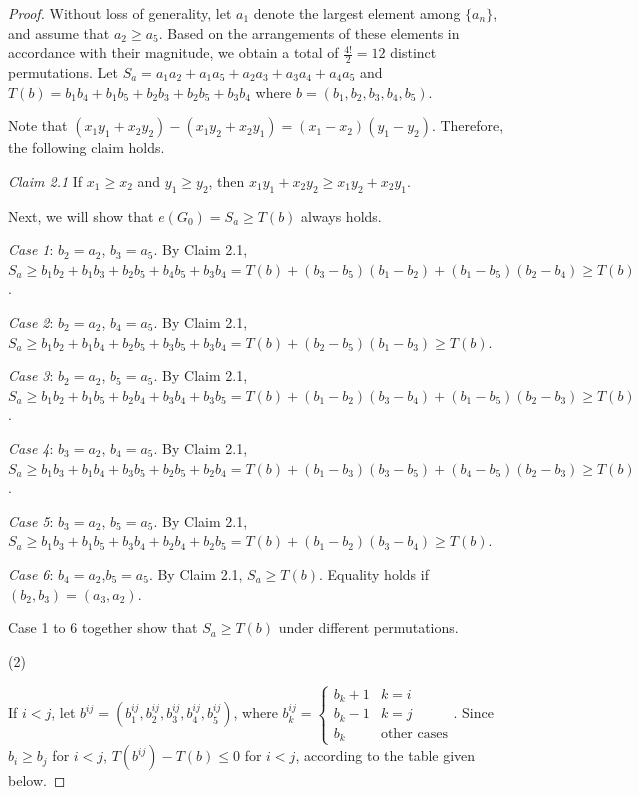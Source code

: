 \documentclass[11pt, oneside]{article}   	%
\begin{document}
\begin{proof}
Without loss of generality, let $ a_1 $ denote the largest element among $\{a_n\}$, and assume that $ a_2 \geq a_5 $. Based on the arrangements of these elements in accordance with their magnitude, we obtain a total of $\frac{4!}{2} = 12$ distinct permutations. Let $ S_a = a_1 a_2 + a_1 a_5 + a_2 a_3 + a_3 a_4 + a_4 a_5 $ and $ T(b) = b_1 b_4 + b_1 b_5 + b_2 b_3 + b_2 b_5 + b_3 b_4 $ where $b=(b_1,b_2,b_3,b_4,b_5)$. 

Note that $(x_1y_1+x_2y_2)-(x_1y_2+x_2y_1)=(x_1-x_2)(y_1-y_2)$. Therefore, the following claim holds.

\textit{Claim 2.1} If $x_1\geq x_2$ and $y_1\geq y_2$, then $x_1y_1+x_2y_2\geq x_1y_2+x_2y_1$.

Next, we will show that $e(G_0)=S_a\geq T(b)$ always holds.

\textit{Case 1}: $b_2=a_2$, $b_3=a_5$. By Claim 2.1, $S_a\geq b_1b_2+b_1b_3+b_2b_5+b_4b_5+b_3b_4=T(b)+(b_3-b_5)(b_1-b_2)+(b_1-b_5)(b_2-b_4)\geq T(b)$. 
        
\textit{Case 2}: $b_2=a_2$, $b_4=a_5$. By Claim 2.1, $S_a\geq b_1b_2+b_1b_4+b_2b_5+b_3b_5+b_3b_4=T(b)+(b_2-b_5)(b_1-b_3)\geq T(b)$. 

\textit{Case 3}: $b_2=a_2$, $b_5=a_5$. By Claim 2.1, $S_a\geq b_1b_2+b_1b_5+b_2b_4+b_3b_4+b_3b_5=T(b)+(b_1-b_2)(b_3-b_4)+(b_1-b_5)(b_2-b_3)\geq T(b)$.

\textit{Case 4}: $b_3=a_2$, $b_4=a_5$. By Claim 2.1, $S_a\geq b_1b_3+b_1b_4+b_3b_5+b_2b_5+b_2b_4=T(b)+(b_1-b_3)(b_3-b_5)+(b_4-b_5)(b_2-b_3)\geq T(b)$.

\textit{Case 5}: $b_3=a_2$, $b_5=a_5$. By Claim 2.1, $S_a\geq b_1b_3+b_1b_5+b_3b_4+b_2b_4+b_2b_5=T(b)+(b_1-b_2)(b_3-b_4)\geq T(b)$. 

\textit{Case 6}: $b_4=a_2$,$b_5=a_5$.  By Claim 2.1, $S_a\geq T(b)$. Equality holds if $(b_2,b_3)=(a_3,a_2)$. 

Case 1 to 6 together show that $S_a\geq T(b)$ under different permutations.

(2)

If $i<j$, let $b^{ij}=(b_1^{i j},b_2^{i j},b_3^{i j},b_4^{i j},b_5^{i j})$, 
where $b_k^{i j}=\begin{cases}    b_k+1 & k=i \\    b_k-1 & k=j \\
    b_k   & \text{other cases}\end{cases}$.
Since $b_i\geq b_j$ for $i<j$, $T({b^{i j}})-T(b)\leq 0$ for $i<j$, according to the table given below.


\end{proof}
\end{document}
